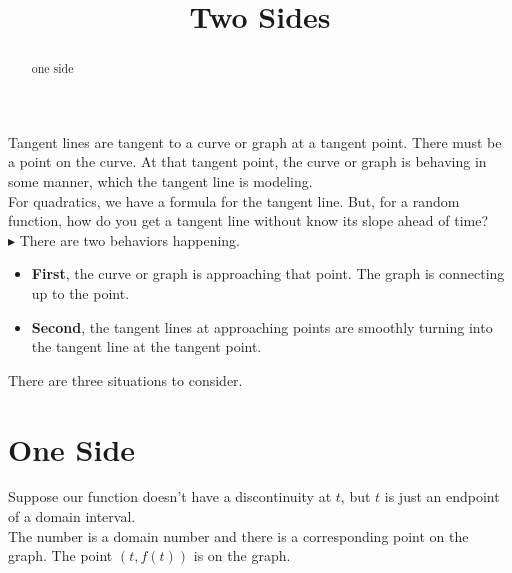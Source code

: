 \documentclass{ximera}
\title{Two Sides}
\begin{document}
\begin{abstract}
one side
\end{abstract}
\maketitle




Tangent lines are tangent to a curve or graph at a tangent point. There must be a point on the curve. At that tangent point, the curve or graph is behaving in some manner, which the tangent line is modeling.  \\



For quadratics, we have a formula for the tangent line. But, for a random function, how do you get a tangent line without know its slope ahead of time? \\


\textbf{\textcolor{red!90!darkgray}{$\blacktriangleright$}} There are two behaviors happening. \\



\begin{itemize}
\item \textbf{First}, the curve or graph is approaching that point. The graph is connecting up to the point.\\
\item \textbf{Second}, the tangent lines at approaching points are smoothly turning into the tangent line at the tangent point. \\
\end{itemize}


There are three situations to consider. \\










\section*{One Side}

Suppose our function doesn't have a discontinuity at $t$, but $t$ is just an endpoint of a domain interval. \\

The number is a domain number and there is a corresponding point on the graph.  The point $(t, f(t))$ is on the graph. \\
\end{document}
